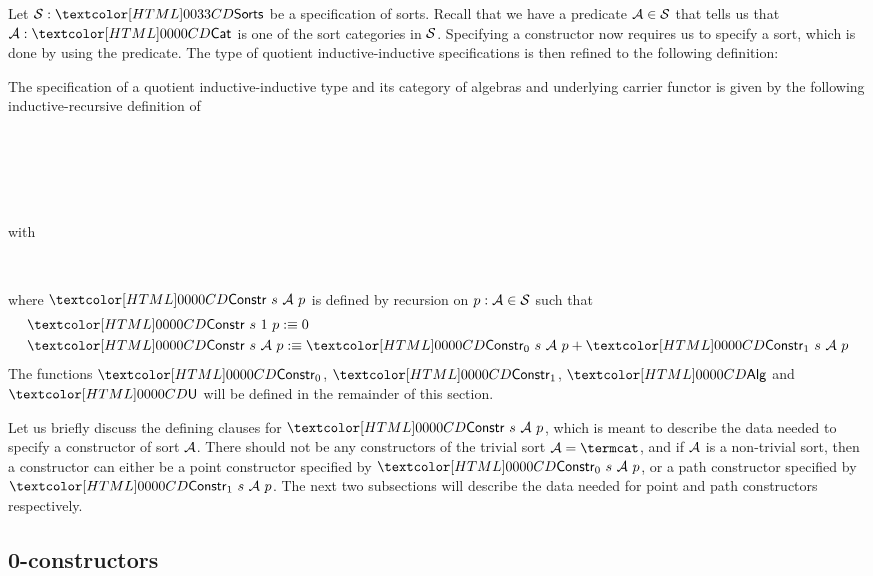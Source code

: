 Let $\Ss : \sortsty$ be a specification of sorts. Recall that we have a
predicate $\mathcal{A} \in \mathcal{S}$ that tells us that $\Aa : \Cat$ is one of the
sort categories in $\mathcal{S}$. Specifying a constructor now requires us to
specify a sort, which is done by using the predicate. The type of
quotient inductive-inductive specifications is then refined to the
following definition:

\begin{definition}
The specification of a quotient inductive-inductive type and its
category of algebras and underlying carrier functor is given by the
following inductive-recursive definition of
\begin{sorts}
  \sortnamety{\specty}{\Set} \\
   \\
  \functy{\Alg}{\specty \to \Cat} \\
   \\
\end{sorts}
% 
with
%
\begin{datatype}{\specty}{}
  \constr{\specnil}{\specty} \\
\end{datatype}
%
where $\Constr\ s\ \Aa\ p$ is defined by recursion on $p : \mathcal{A} \in \mathcal{S}$ such that
\begin{align*}
&\Constr\ s\ 1\ p \ddefeq 0 \\
&\Constr\ s\ \Aa\ p \ddefeq \Constr_0\ s\ \Aa\ p + \Constr_1\ s\ \Aa\ p
\end{align*}
%
The functions $\Constr_0$, $\Constr_1$, $\Alg$ and $\Und$ will be
defined in the remainder of this section.
\end{definition}

Let us briefly discuss the defining clauses for $\Constr\ s\ \Aa\ p$,
which is meant to describe the data needed to specify a constructor of
sort $\mathcal{A}$. There should not be any constructors of the trivial sort
$\Aa = \termcat$, and if $\mathcal{A}$ is a non-trivial sort, then a
constructor can either be a point constructor specified by
$\Constr_0\ s\ \Aa\ p$, or a path constructor specified by
$\Constr_1\ s\ \Aa\ p$. The next two subsections will describe the
data needed for point and path constructors respectively.

\subsection{0-constructors}

